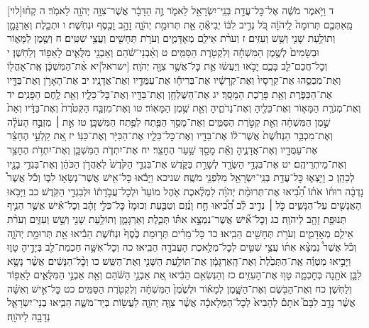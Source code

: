 \documentclass[twoside, openany, parskip=half, 11pt]{book}
\begin{document}
[לוי]ד וַיֹּ֣אמֶר מֹשֶׁ֔ה אֶל־כׇּל־עֲדַ֥ת בְּנֵֽי־יִשְׂרָאֵ֖ל לֵאמֹ֑ר זֶ֣ה הַדָּבָ֔ר אֲשֶׁר־צִוָּ֥ה יְהֹוָ֖ה לֵאמֹֽר׃ ה קְח֨וּ מֵֽאִתְּכֶ֤ם תְּרוּמָה֙ לַֽיהֹוָ֔ה כֹּ֚ל נְדִ֣יב לִבּ֔וֹ יְבִיאֶ֕הָ אֵ֖ת תְּרוּמַ֣ת יְהֹוָ֑ה זָהָ֥ב וָכֶ֖סֶף וּנְחֹֽשֶׁת׃ ו וּתְכֵ֧לֶת וְאַרְגָּמָ֛ן וְתוֹלַ֥עַת שָׁנִ֖י וְשֵׁ֥שׁ וְעִזִּֽים׃ ז וְעֹרֹ֨ת אֵילִ֧ם מְאׇדָּמִ֛ים וְעֹרֹ֥ת תְּחָשִׁ֖ים וַעֲצֵ֥י שִׁטִּֽים׃ ח וְשֶׁ֖מֶן לַמָּא֑וֹר וּבְשָׂמִים֙ לְשֶׁ֣מֶן הַמִּשְׁחָ֔ה וְלִקְטֹ֖רֶת הַסַּמִּֽים׃ ט וְאַ֨בְנֵי־שֹׁ֔הַם וְאַבְנֵ֖י מִלֻּאִ֑ים לָאֵפ֖וֹד וְלַחֹֽשֶׁן׃ י וְכׇל־חֲכַם־לֵ֖ב בָּכֶ֑ם יָבֹ֣אוּ וְיַעֲשׂ֔וּ אֵ֛ת כׇּל־אֲשֶׁ֥ר צִוָּ֖ה יְהֹוָֽה׃ [ישראל]יא אֶ֨ת־הַמִּשְׁכָּ֔ן אֶֽת־אׇהֳל֖וֹ וְאֶת־מִכְסֵ֑הוּ אֶת־קְרָסָיו֙ וְאֶת־קְרָשָׁ֔יו אֶת־בְּרִיחָ֕ו אֶת־עַמֻּדָ֖יו וְאֶת־אֲדָנָֽיו׃ יב אֶת־הָאָרֹ֥ן וְאֶת־בַּדָּ֖יו אֶת־הַכַּפֹּ֑רֶת וְאֵ֖ת פָּרֹ֥כֶת הַמָּסָֽךְ׃ יג אֶת־הַשֻּׁלְחָ֥ן וְאֶת־בַּדָּ֖יו וְאֶת־כׇּל־כֵּלָ֑יו וְאֵ֖ת לֶ֥חֶם הַפָּנִֽים׃ יד וְאֶת־מְנֹרַ֧ת הַמָּא֛וֹר וְאֶת־כֵּלֶ֖יהָ וְאֶת־נֵרֹתֶ֑יהָ וְאֵ֖ת שֶׁ֥מֶן הַמָּאֽוֹר׃ טו וְאֶת־מִזְבַּ֤ח הַקְּטֹ֙רֶת֙ וְאֶת־בַּדָּ֔יו וְאֵת֙ שֶׁ֣מֶן הַמִּשְׁחָ֔ה וְאֵ֖ת קְטֹ֣רֶת הַסַּמִּ֑ים וְאֶת־מָסַ֥ךְ הַפֶּ֖תַח לְפֶ֥תַח הַמִּשְׁכָּֽן׃ טז אֵ֣ת ׀ מִזְבַּ֣ח הָעֹלָ֗ה וְאֶת־מִכְבַּ֤ר הַנְּחֹ֙שֶׁת֙ אֲשֶׁר־ל֔וֹ אֶת־בַּדָּ֖יו וְאֶת־כׇּל־כֵּלָ֑יו אֶת־הַכִּיֹּ֖ר וְאֶת־כַּנּֽוֹ׃ יז אֵ֚ת קַלְעֵ֣י הֶחָצֵ֔ר אֶת־עַמֻּדָ֖יו וְאֶת־אֲדָנֶ֑יהָ וְאֵ֕ת מָסַ֖ךְ שַׁ֥עַר הֶחָצֵֽר׃ יח אֶת־יִתְדֹ֧ת הַמִּשְׁכָּ֛ן וְאֶת־יִתְדֹ֥ת הֶחָצֵ֖ר וְאֶת־מֵיתְרֵיהֶֽם׃ יט אֶת־בִּגְדֵ֥י הַשְּׂרָ֖ד לְשָׁרֵ֣ת בַּקֹּ֑דֶשׁ אֶת־בִּגְדֵ֤י הַקֹּ֙דֶשׁ֙ לְאַהֲרֹ֣ן הַכֹּהֵ֔ן וְאֶת־בִּגְדֵ֥י בָנָ֖יו לְכַהֵֽן׃ כ וַיֵּ֥צְא֛וּ כׇּל־עֲדַ֥ת בְּנֵֽי־יִשְׂרָאֵ֖ל מִלִּפְנֵ֥י מֹשֶֽׁה׃ שניכא וַיָּבֹ֕אוּ כׇּל־אִ֖ישׁ אֲשֶׁר־נְשָׂא֣וֹ לִבּ֑וֹ וְכֹ֡ל אֲשֶׁר֩ נָדְבָ֨ה רוּח֜וֹ אֹת֗וֹ הֵ֠בִ֠יאוּ אֶת־תְּרוּמַ֨ת יְהֹוָ֜ה לִמְלֶ֨אכֶת אֹ֤הֶל מוֹעֵד֙ וּלְכׇל־עֲבֹ֣דָת֔וֹ וּלְבִגְדֵ֖י הַקֹּֽדֶשׁ׃ כב וַיָּבֹ֥אוּ הָאֲנָשִׁ֖ים עַל־הַנָּשִׁ֑ים כֹּ֣ל ׀ נְדִ֣יב לֵ֗ב הֵ֠בִ֠יאוּ חָ֣ח וָנֶ֜זֶם וְטַבַּ֤עַת וְכוּמָז֙ כׇּל־כְּלִ֣י זָהָ֔ב וְכׇל־אִ֕ישׁ אֲשֶׁ֥ר הֵנִ֛יף תְּנוּפַ֥ת זָהָ֖ב לַיהֹוָֽה׃ כג וְכׇל־אִ֞ישׁ אֲשֶׁר־נִמְצָ֣א אִתּ֗וֹ תְּכֵ֧לֶת וְאַרְגָּמָ֛ן וְתוֹלַ֥עַת שָׁנִ֖י וְשֵׁ֣שׁ וְעִזִּ֑ים וְעֹרֹ֨ת אֵילִ֧ם מְאׇדָּמִ֛ים וְעֹרֹ֥ת תְּחָשִׁ֖ים הֵבִֽיאוּ׃ כד כׇּל־מֵרִ֗ים תְּר֤וּמַת כֶּ֙סֶף֙ וּנְחֹ֔שֶׁת הֵבִ֕יאוּ אֵ֖ת תְּרוּמַ֣ת יְהֹוָ֑ה וְכֹ֡ל אֲשֶׁר֩ נִמְצָ֨א אִתּ֜וֹ עֲצֵ֥י שִׁטִּ֛ים לְכׇל־מְלֶ֥אכֶת הָעֲבֹדָ֖ה הֵבִֽיאוּ׃ כה וְכׇל־אִשָּׁ֥ה חַכְמַת־לֵ֖ב בְּיָדֶ֣יהָ טָו֑וּ וַיָּבִ֣יאוּ מַטְוֶ֗ה אֶֽת־הַתְּכֵ֙לֶת֙ וְאֶת־הָֽאַרְגָּמָ֔ן אֶת־תּוֹלַ֥עַת הַשָּׁנִ֖י וְאֶת־הַשֵּֽׁשׁ׃ כו וְכׇ֨ל־הַנָּשִׁ֔ים אֲשֶׁ֨ר נָשָׂ֥א לִבָּ֛ן אֹתָ֖נָה בְּחׇכְמָ֑ה טָו֖וּ אֶת־הָעִזִּֽים׃ כז וְהַנְּשִׂאִ֣ם הֵבִ֔יאוּ אֵ֚ת אַבְנֵ֣י הַשֹּׁ֔הַם וְאֵ֖ת אַבְנֵ֣י הַמִּלֻּאִ֑ים לָאֵפ֖וֹד וְלַחֹֽשֶׁן׃ כח וְאֶת־הַבֹּ֖שֶׂם וְאֶת־הַשָּׁ֑מֶן לְמָא֕וֹר וּלְשֶׁ֙מֶן֙ הַמִּשְׁחָ֔ה וְלִקְטֹ֖רֶת הַסַּמִּֽים׃ כט כׇּל־אִ֣ישׁ וְאִשָּׁ֗ה אֲשֶׁ֨ר נָדַ֣ב לִבָּם֮ אֹתָם֒ לְהָבִיא֙ לְכׇל־הַמְּלָאכָ֔ה אֲשֶׁ֨ר צִוָּ֧ה יְהֹוָ֛ה לַעֲשׂ֖וֹת בְּיַד־מֹשֶׁ֑ה הֵבִ֧יאוּ בְנֵי־יִשְׂרָאֵ֛ל נְדָבָ֖ה לַיהֹוָֽה׃
\end{document}
